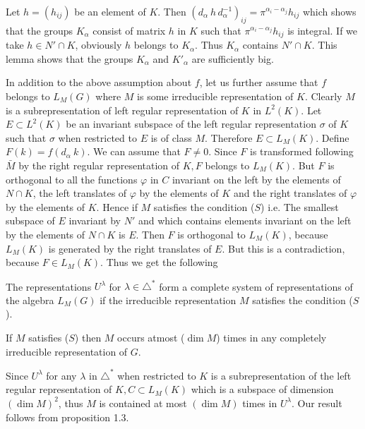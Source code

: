 Let $h = (h_{ij})$ be an element of $K$. Then
$(d_\alpha~h\,d^{-1}_\alpha)_{ij} =
\pi^{\alpha_i-\alpha_{j}} h_{ij}$ which shows that the groups
$K_\alpha$ consist of matrix $h$ in $K$ such that
$\pi^{\alpha_i-\alpha_j} {h_{ij}}$ is integral. If we take $h
\in N'\cap K$, obviously $h$ belongs to $K_\alpha$. Thus $K_\alpha$
contains $N'\cap K$. This lemma shows that the groups $K_\alpha$ and
$K'_\alpha$ are sufficiently big. 

 In addition to the above assumption about $f$, let us further assume
 that $f$ belongs to $L_M(G)$ where $M$ is some irreducible
 representation of $K$. Clearly $M$ is a subrepresentation of left
 regular representation of $K$ in $L^2(K)$. Let $E \subset L^2(K)$ be
 an invariant subspace of the left regular representation $\sigma$ of
 $K$ such that $\sigma$ when restricted to $E$ is of class
 $M$. Therefore $E\subset L_M(K)$. Define $F(k) = f(d_\alpha~k)$. We
 can assume that $F \neq 0$. Since $F$ is transformed following
 $\bar{M}$ by the right regular representation of $K,F$ belongs to
 $L_M(K)$. But $F$ is orthogonal to all the functions $\varphi$ in $C$
 invariant on the left by the elements of $N \cap K$, the left
 translates of $\varphi$ by the elements of $K$ and the right
 translates of $\varphi$ by the elements of $K$. Hence if $M$
 satisfies the condition ($S$) i.e. The smallest subspace of $E$
 invariant by $N'$ and which contains elements invariant on the left
 by the elements of $N \cap K$ is $E$. Then $F$ is orthogonal to
 $L_M(K)$, because $L_M(K)$ is generated by the right translates
 of\pageoriginale 
 $E$. But this is a contradiction, because $F \in L_M(K)$. Thus we get
 the following 
\begin{theorem}\label{part2:chap2:sec4:thm3}%
  The representations $U^\lambda$ for $\lambda\in \triangle^*$ form a
  complete system of representations of the algebra $L_M(G)$ if the
  irreducible representation $M$ satisfies the condition ($S$). 
\end{theorem} 

\setcounter{corollary}{0}
\begin{corollary}\label{part2:chap2:sec4:coro1}%
  If $M$ satisfies ($S$) then $M$ occurs atmost ($\dim M$) times in
  any completely irreducible representation of $G$. 
\end{corollary}

Since $U^\lambda$ for any $\lambda$ in $\triangle^*$ when restricted
to $K$ is a subrepresentation of the left regular representation of
$K,C\subset L_M(K)$ which is a subspace of dimension $(\dim M)^2$,
thus $M$ is contained at most $(\dim M)$ times in $U^\lambda$. Our
result follows from proposition 1.3. 


